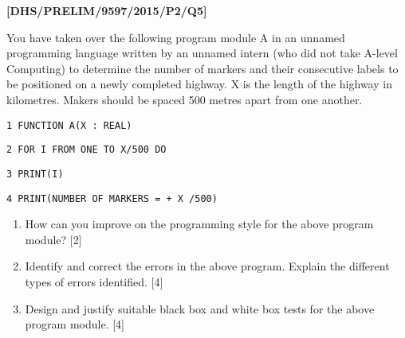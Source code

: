 \item \textbf{{[}DHS/PRELIM/9597/2015/P2/Q5{]} }

You have taken over the following program module A in an unnamed programming
language written by an unnamed intern (who did not take A-level Computing)
to determine the number of markers and their consecutive labels to
be positioned on a newly completed highway. X is the length of the
highway in kilometres. Makers should be spaced 500 metres apart from
one another. 

\noindent %
\noindent\begin{minipage}[t]{1\columnwidth}%
\texttt{1 FUNCTION A(X : REAL) }

\texttt{2 FOR I FROM ONE TO X/500 DO }

\texttt{3 PRINT(I) }

\texttt{4 PRINT(\textquotedbl NUMBER OF MARKERS = \textquotedbl{}
+ X /500) }%
\end{minipage}
\begin{enumerate}
\item How can you improve on the programming style for the above program
module? \hfill{}{[}2{]}
\item Identify and correct the errors in the above program. Explain the
different types of errors identified.\hfill{} {[}4{]}
\item Design and justify suitable black box and white box tests for the
above program module. \hfill{}{[}4{]}
\end{enumerate}